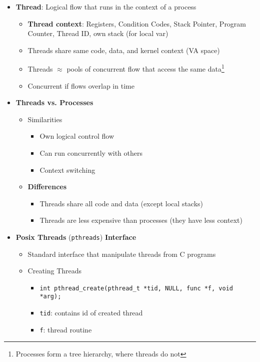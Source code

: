 \documentclass[12pt]{article}
\begin{document}
{\begin{itemize}
\begin{itemize}
\begin{itemize}
			\item Cannot take advantage of multi-core (single control)
		\end{itemize}
	\end{itemize}
	\item \textbf{Thread}: Logical flow that runs in the context of a process
	\begin{itemize}
		\item \textbf{Thread context}: Registers, Condition Codes, Stack Pointer, Program Counter, Thread ID, own stack (for local var)
		\item Threads share same code, data, and kernel context (VA space)
		\item Threads $\approx$ pools of concurrent flow that access the same data\footnote{Processes form a tree hierarchy, where threads do not}
		\item Concurrent if flows overlap in time
	\end{itemize}
	\item \textbf{Threads vs. Processes}
	\begin{itemize}
		\item Similarities
		\begin{itemize}
			\item Own logical control flow
			\item Can run concurrently with others
			\item Context switching
		\end{itemize}
		\item \textbf{Differences}
		\begin{itemize}
			\item Threads share all code and data (except local stacks)
			\item Threads are less expensive than processes (they have less context)
		\end{itemize}
	\end{itemize}
	\item \textbf{Posix Threads} (\texttt{pthreads}) \textbf{Interface}
	\begin{itemize}
		\item Standard interface that manipulate threads from C programs
		\item Creating Threads
		\begin{itemize}
			\item \texttt{int pthread\_create(pthread\_t *tid, NULL, func *f, void *arg);}
			\item \texttt{tid}: contains id of created thread
			\item \texttt{f}: thread routine

\end{itemize}
\end{itemize}
\end{itemize}}
\end{document}
